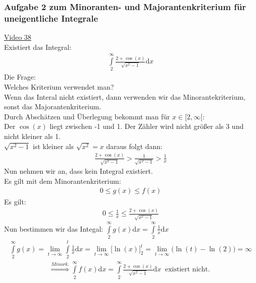 \subsubsection{Aufgabe 2 zum Minoranten- und Majorantenkriterium für uneigentliche Integrale}
\href{https://youtu.be/XJG5oZmOEVE}{Video 38}\\
Existiert das Integral:\\
\begin{align*}
\int\limits_{2}^{\infty} \frac{2+\cos(x)}{\sqrt{x^2-1}}\mathrm{d}x
\end{align*}
Die Frage:\\
Welches Kriterium verwendet man?\\
Wenn das Interal nicht existiert, dann verwenden wir das Minorantekriterium, sonst das Majorantenkriterium.\\
Durch Abschätzen und Überlegung bekommt man für $ x\in[2,\infty[ $:\\
Der $ \cos(x) $ liegt zwischen -1 und 1. Der Zähler wird nicht größer als 3 und nicht kleiner als 1.\\
$ \sqrt{x^2-1} $ ist kleiner als $ \sqrt{x^2}=x $ daraus folgt dann:\\
\begin{align*}
\frac{2+\cos(x)}{\sqrt{x^2-1}}>\frac{1}{\sqrt{x^2-1}}>\frac{1}{x}
\end{align*}
Nun nehmen wir an, dass kein Integral existiert.\\
Es gilt mit dem Minorantenkriterium:\\
\begin{align*}
0\leq g(x)\leq f(x)
\end{align*}
Es gilt:\\
\begin{align*}
0\leq \frac{1}{x}\leq \frac{2+\cos(x)}{\sqrt{x^2-1}}
\end{align*}
Nun bestimmen wir das Integal: $ \int\limits_{2}^{\infty} g(x)\mathrm{d}x=\int\limits_{2}^{\infty} \frac{1}{x}\mathrm{d}x $\\
\begin{align*}
\int\limits_{2}^{\infty} g(x)=\lim\limits_ {t\to\infty}\int\limits_{2}^{t}\frac{1}{x}\mathrm{d} x=\lim\limits_ {t\to\infty}\bigg[\ln(x)\bigg]^t_2=\lim\limits_ {t\to\infty}\bigg(\ln(t)-\ln(2)\bigg)=\infty
\end{align*}
\begin{align*}
\overset{Minork.}{\Rightarrow}\int\limits_{2}^{\infty} f(x)\mathrm{d}x=\int\limits_{2}^{\infty} \frac{2+\cos(x)}{\sqrt{x^2-1}}\mathrm{d}x\;\;\text{existiert nicht. }
\end{align*}
